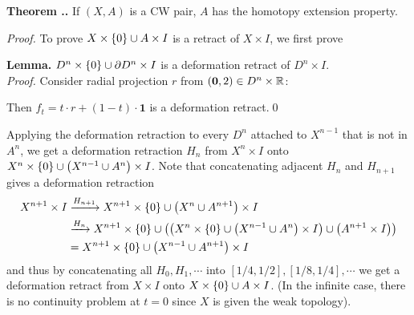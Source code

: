 \documentclass{natsirt}
\newcounter{def}[section]
\newcounter{thm}[section]
\newenvironment{thmbox}[1][]{
\begin{greenbox}[#1]\refstepcounter{thm}\textbf{Theorem \thesection.\thethm. }}{\end{greenbox}}
\begin{document}
\begin{thmbox}
    If $(X,A)$ is a CW pair, $A$ has the homotopy extension property.
\end{thmbox}
\textit{Proof.} To prove $X\times\left\{ 0 \right\} \cup A\times I$ is a retract of $X\times I$, we first prove
\begin{whitebox}
    \textbf{Lemma.} $D^n\times \left\{ 0 \right\} \cup \partial D^n \times I$ is a deformation retract of $D^n \times I$.\vspace{0.4cm}\\
    \textit{Proof.} Consider radial projection $r$ from $(\textbf{0},2)\in D^n \times\mathbb{R}$:
    \begin{center}
    \end{center}
    Then $f_t = t \cdot r + (1-t) \cdot \textbf{1}$ is a deformation retract.\qed
\end{whitebox}
Applying the deformation retraction to every $D^n$ attached to $X^{n-1}$ that is not in $A^n$, we get a deformation retraction $H_n$ from $X^n\times I$ onto $X^n\times \left\{ 0 \right\}\cup \left( X^{n-1}\cup A^n \right)\times I$. Note that concatenating adjacent $H_n$ and $H_{n+1}$ gives a deformation retraction
\begin{align*}
    X^{n+1}\times I &\xrightarrow{H_{n+1}} X^{n+1}\times \left\{ 0 \right\}\cup \left( X^{n}\cup A^{n+1} \right)\times I\\
    &\xrightarrow{H_n} X^{n+1}\times \left\{ 0 \right\}\cup \left( \left( X^{n}\times \left\{ 0 \right\}\cup \left( X^{n-1}\cup A^n \right)\times I \right)\cup \left( A^{n+1}\times I \right) \right)\\
    &= X^{n+1}\times \left\{ 0 \right\} \cup \left( X^{n-1}\cup A^{n+1} \right)\times I
\end{align*}
and thus by concatenating all $H_0,H_1,\cdots$ into $[1/4,1/2], [1/8,1/4],\cdots$ we get a deformation retract from $X\times I $ onto $ X\times\left\{ 0 \right\} \cup A \times I$. (In the infinite case, there is no continuity problem at $t=0$ since $X$ is given the weak topology).\QED
\end{document}
